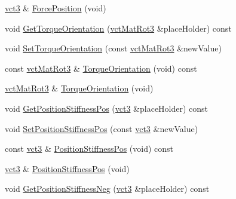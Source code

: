 \begin{DoxyCompactItemize}
\item 
\hyperlink{vct_fixed_size_vector_types_8h_a3af82acdbf4eeb73c551909240b106ea}{vct3} \& \hyperlink{classprm_fixture_gain_cartesian_set_a5cd1d3ef930e690cc4a9ac5a5d42f6fb}{Force\-Position} (void)
\item 
void \hyperlink{classprm_fixture_gain_cartesian_set_a47de592368ff62a4d1c1e94a93111a6e}{Get\-Torque\-Orientation} (\hyperlink{vct_transformation_types_8h_a30fe23c1d38748a9b8f2fb9bb2471382}{vct\-Mat\-Rot3} \&place\-Holder) const 
\item 
void \hyperlink{classprm_fixture_gain_cartesian_set_a8bcfae0432259a501726c5002730b914}{Set\-Torque\-Orientation} (const \hyperlink{vct_transformation_types_8h_a30fe23c1d38748a9b8f2fb9bb2471382}{vct\-Mat\-Rot3} \&new\-Value)
\item 
const \hyperlink{vct_transformation_types_8h_a30fe23c1d38748a9b8f2fb9bb2471382}{vct\-Mat\-Rot3} \& \hyperlink{classprm_fixture_gain_cartesian_set_a83e0c0e672126a69fb3f65f6f7a744b5}{Torque\-Orientation} (void) const 
\item 
\hyperlink{vct_transformation_types_8h_a30fe23c1d38748a9b8f2fb9bb2471382}{vct\-Mat\-Rot3} \& \hyperlink{classprm_fixture_gain_cartesian_set_ad87617798440989b0ae378db5bf08b1e}{Torque\-Orientation} (void)
\item 
void \hyperlink{classprm_fixture_gain_cartesian_set_a8fb49f7495f0fc008620c27cf6d09d94}{Get\-Position\-Stiffness\-Pos} (\hyperlink{vct_fixed_size_vector_types_8h_a3af82acdbf4eeb73c551909240b106ea}{vct3} \&place\-Holder) const 
\item 
void \hyperlink{classprm_fixture_gain_cartesian_set_a18291351c7d0cd9e10be3bd2e09c7ffe}{Set\-Position\-Stiffness\-Pos} (const \hyperlink{vct_fixed_size_vector_types_8h_a3af82acdbf4eeb73c551909240b106ea}{vct3} \&new\-Value)
\item 
const \hyperlink{vct_fixed_size_vector_types_8h_a3af82acdbf4eeb73c551909240b106ea}{vct3} \& \hyperlink{classprm_fixture_gain_cartesian_set_ac8a7c4d1370e312e53932c71d34aacb3}{Position\-Stiffness\-Pos} (void) const 
\item 
\hyperlink{vct_fixed_size_vector_types_8h_a3af82acdbf4eeb73c551909240b106ea}{vct3} \& \hyperlink{classprm_fixture_gain_cartesian_set_a969b7e29060ed570104c4f1dac83e8f1}{Position\-Stiffness\-Pos} (void)
\item 
void \hyperlink{classprm_fixture_gain_cartesian_set_a0ddb1c15b90fc5b269a64fa2d44806c6}{Get\-Position\-Stiffness\-Neg} (\hyperlink{vct_fixed_size_vector_types_8h_a3af82acdbf4eeb73c551909240b106ea}{vct3} \&place\-Holder) const 

\end{DoxyCompactItemize}

